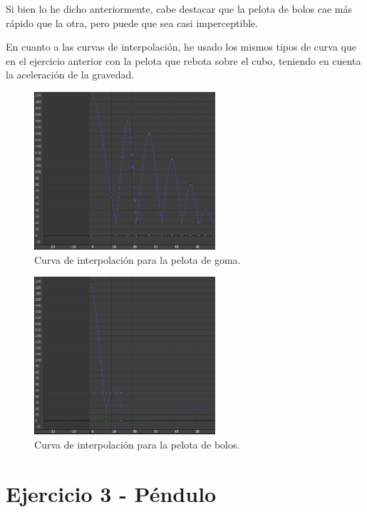 \documentclass{article}
\begin{document}
Si bien lo he dicho anteriormente, cabe destacar que la pelota de bolos cae más rápido que la otra, pero puede que sea casi imperceptible.

\bigskip

En cuanto a las curvas de interpolación, he usado los mismos tipos de curva que en el ejercicio anterior con la pelota que rebota sobre el cubo, teniendo en cuenta la aceleración de la gravedad. 

\begin{figure}[H]
    \centering
    \includegraphics[width=0.6\textwidth]{imagenes/Ejercicio 2/curva_p1.png}
    \caption{Curva de interpolación para la pelota de goma.}
\end{figure}

\begin{figure}[H]
    \centering
    \includegraphics[width=0.6\textwidth]{imagenes/Ejercicio 2/curva_p2.png}
    \caption{Curva de interpolación para la pelota de bolos.}
\end{figure}


\section{Ejercicio 3 - Péndulo}
\end{document}
